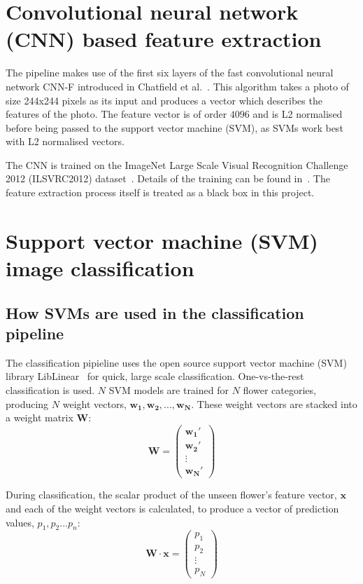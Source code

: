 \documentclass[11pt, a4paper]{report}
\newcommand{\vect}[1]{\boldsymbol{#1}}
\begin{document}
\section{Convolutional neural network (CNN) based feature extraction}

The pipeline makes use of the first six layers of the fast convolutional neural network CNN-F introduced in Chatfield et al.~\cite{Chatfield14}. This algorithm takes a photo of size 244x244 pixels as its input and produces a vector which describes the features of the photo. The feature vector is of order $4096$ and is L2 normalised before being passed to the support vector machine (SVM), as SVMs work best with L2 normalised vectors.

The CNN is trained on the ImageNet Large Scale Visual Recognition Challenge 2012 (ILSVRC2012) dataset~\cite{CNN:Imagenet}. Details of the training can be found in~\cite{Chatfield14}. The feature extraction process itself is treated as a black box in this project. 

 


\section{Support vector machine (SVM) image classification}

\subsection{How SVMs are used in the classification pipeline}

The classification pipieline uses the open source support vector machine (SVM) library LibLinear~\cite{SVM:LibLinear} for quick, large scale classification. One-vs-the-rest classification is used. $N$ SVM models are trained for $N$ flower categories, producing $N$ weight vectors, $\vect{w_{1}}, \vect{w_{2}}, ..., \vect{w_{N}}$. These weight vectors are stacked into a weight matrix $\vect{W}$: 
$$
\vect{W} = 
\begin{pmatrix}
\vect{w_{1}'}\\  
\vect{w_{2}'}\\ 
\vdots \\ 
\vect{w_{N}'}
\end{pmatrix}
$$



During classification, the scalar product of the unseen flower's feature vector, $\vect{x}$ and each of the weight vectors is calculated, to produce a vector of prediction values, $p_{1}, p_{2} ... p_{n}$:
$$
\vect{W} \cdot \vect{x} =
\begin{pmatrix}
p_{1}\\  
p_{2}\\ 
\vdots \\ 
p_{N}
\end{pmatrix}
$$
\end{document}
